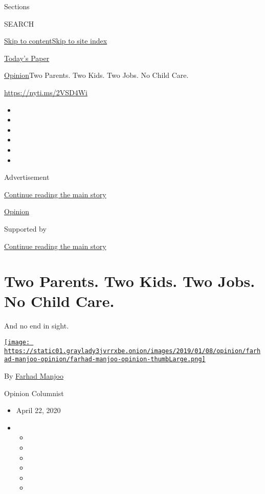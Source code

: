 Sections

SEARCH

\protect\hyperlink{site-content}{Skip to
content}\protect\hyperlink{site-index}{Skip to site index}

\href{https://myaccount.nytimes3xbfgragh.onion/auth/login?response_type=cookie\&client_id=vi}{}

\href{https://www.nytimes3xbfgragh.onion/section/todayspaper}{Today's
Paper}

\href{/section/opinion}{Opinion}\textbar{}Two Parents. Two Kids. Two
Jobs. No Child Care.

\url{https://nyti.ms/2VSD4Wi}

\begin{itemize}
\item
\item
\item
\item
\item
\item
\end{itemize}

Advertisement

\protect\hyperlink{after-top}{Continue reading the main story}

\href{/section/opinion}{Opinion}

Supported by

\protect\hyperlink{after-sponsor}{Continue reading the main story}

\hypertarget{two-parents-two-kids-two-jobs-no-child-care}{%
\section{Two Parents. Two Kids. Two Jobs. No Child
Care.}\label{two-parents-two-kids-two-jobs-no-child-care}}

And no end in sight.

\href{https://www.nytimes3xbfgragh.onion/by/farhad-manjoo}{\texttt{[image: https://static01.graylady3jvrrxbe.onion/images/2019/01/08/opinion/farhad-manjoo-opinion/farhad-manjoo-opinion-thumbLarge.png]}}

By \href{https://www.nytimes3xbfgragh.onion/by/farhad-manjoo}{Farhad
Manjoo}

Opinion Columnist

\begin{itemize}
\item
  April 22, 2020
\item
  \begin{itemize}
  \item
  \item
  \item
  \item
  \item
  \item
  \end{itemize}
\end{itemize}

